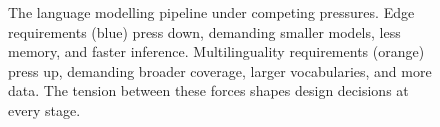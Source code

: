 \begin{figure}[t]
{%
    }%
    \caption{
        The language modelling pipeline under competing pressures.
        Edge requirements (\textcolor{cindigo}{blue}) press down,
        demanding smaller models, less memory, and faster inference.
        Multilinguality requirements (\textcolor{ccrest}{orange}) press up,
        demanding broader coverage, larger vocabularies, and more data.
        The tension between these forces shapes design decisions at every stage.
    }
    \label{fig:pipeline}
\end{figure}
